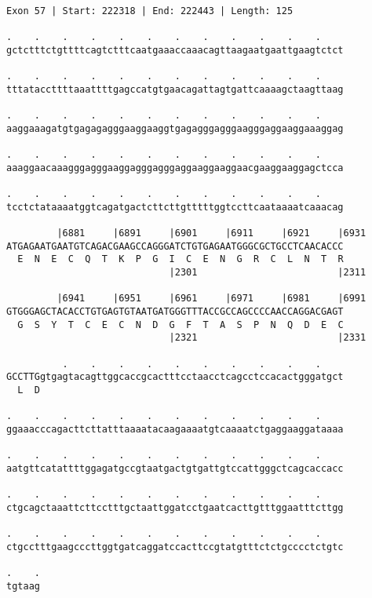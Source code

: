 \documentclass{article}
\begin{document}
\begin{Verbatim}[fontfamily=courier]
Exon 57 | Start: 222318 | End: 222443 | Length: 125

.    .    .    .    .    .    .    .    .    .    .    .    
gctctttctgttttcagtctttcaatgaaaccaaacagttaagaatgaattgaagtctct

.    .    .    .    .    .    .    .    .    .    .    .    
tttataccttttaaattttgagccatgtgaacagattagtgattcaaaagctaagttaag

.    .    .    .    .    .    .    .    .    .    .    .    
aaggaaagatgtgagagagggaaggaaggtgagagggagggaagggaggaaggaaaggag

.    .    .    .    .    .    .    .    .    .    .    .    
aaaggaacaaagggagggaaggagggagggaggaaggaaggaacgaaggaaggagctcca

.    .    .    .    .    .    .    .    .    .    .    .    
tcctctataaaatggtcagatgactcttcttgtttttggtccttcaataaaatcaaacag

         |6881     |6891     |6901     |6911     |6921     |6931
ATGAGAATGAATGTCAGACGAAGCCAGGGATCTGTGAGAATGGGCGCTGCCTCAACACCC
  E  N  E  C  Q  T  K  P  G  I  C  E  N  G  R  C  L  N  T  R
                             |2301                         |2311

         |6941     |6951     |6961     |6971     |6981     |6991
GTGGGAGCTACACCTGTGAGTGTAATGATGGGTTTACCGCCAGCCCCAACCAGGACGAGT
  G  S  Y  T  C  E  C  N  D  G  F  T  A  S  P  N  Q  D  E  C
                             |2321                         |2331

          .    .    .    .    .    .    .    .    .    .    
GCCTTGgtgagtacagttggcaccgcactttcctaacctcagcctccacactgggatgct
  L  D                                                      

.    .    .    .    .    .    .    .    .    .    .    .    
ggaaacccagacttcttatttaaaatacaagaaaatgtcaaaatctgaggaaggataaaa

.    .    .    .    .    .    .    .    .    .    .    .    
aatgttcatattttggagatgccgtaatgactgtgattgtccattgggctcagcaccacc

.    .    .    .    .    .    .    .    .    .    .    .    
ctgcagctaaattcttcctttgctaattggatcctgaatcacttgtttggaatttcttgg

.    .    .    .    .    .    .    .    .    .    .    .    
ctgcctttgaagcccttggtgatcaggatccacttccgtatgtttctctgcccctctgtc

.    .
tgtaag
\end{Verbatim}
\newpage
\end{document}
